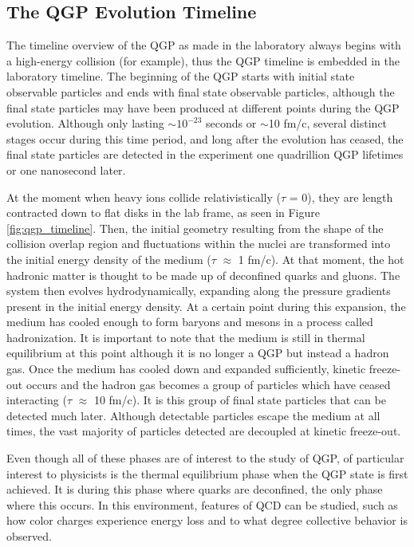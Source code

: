 \subsection{The QGP Evolution Timeline}
The timeline overview of the QGP as made in the laboratory always begins with a high-energy collision (\auau for example), thus the QGP timeline is embedded in the laboratory timeline. The beginning of the QGP starts with initial state observable particles and ends with final state observable particles, although the final state particles may have been produced at different points during the QGP evolution. Although only lasting $\sim10^{-23}$ seconds or $\sim$10 fm/c, several distinct stages occur during this time period, and long after the evolution has ceased, the final state particles are detected in the experiment one quadrillion QGP lifetimes or one nanosecond later.

At the moment when heavy ions collide relativistically ($\tau$ = 0), they are length contracted down to flat disks in the lab frame, as seen in Figure \ref{fig:qgp_timeline}. Then, the initial geometry resulting from the shape of the collision overlap region and fluctuations within the nuclei are transformed into the initial energy density of the medium ($\tau$ $\approx$ 1 fm/c). At that moment, the hot hadronic matter is thought to be made up of deconfined quarks and gluons. The system then evolves hydrodynamically, expanding along the pressure gradients present in the initial energy density. At a certain point during this expansion, the medium has cooled enough to form baryons and mesons in a process called hadronization. It is important to note that the medium is still in thermal equilibrium at this point although it is no longer a QGP but instead a hadron gas. Once the medium has cooled down and expanded sufficiently, kinetic freeze-out occurs and the hadron gas becomes a group of particles which have ceased interacting ($\tau$ $\approx$ 10 fm/c). It is this group of final state particles that can be detected much later. Although detectable particles escape the medium at all times, the vast majority of particles detected are decoupled at kinetic freeze-out. 

Even though all of these phases are of interest to the study of QGP, of particular interest to physicists is the thermal equilibrium phase when the QGP state is first achieved. It is during this phase where quarks are deconfined, the only phase where this occurs. In this environment, features of QCD can be studied, such as how color charges experience energy loss and to what degree  collective behavior is observed. 

